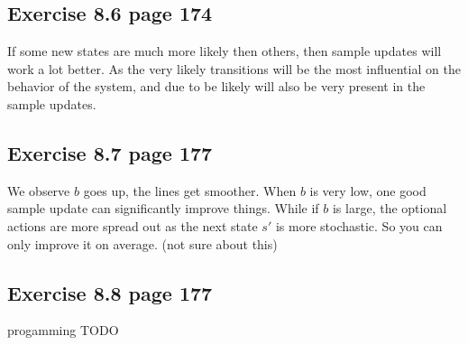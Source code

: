 \subsection{Exercise 8.6 page 174}
If some new states are much more likely then others, then sample updates will work a lot better. As the very likely transitions will be the most influential on the behavior of the system, and due to be likely will also be very present in the sample updates. 

\subsection{Exercise 8.7 page 177}
We observe $b$ goes up, the lines get smoother. When $b$ is very low, one good sample update can significantly improve things. While if $b$ is large, the optional actions are more spread out as the next state $s'$ is more stochastic. So you can only improve it on average. (not sure about this)

\subsection{Exercise 8.8 page 177}
progamming TODO
